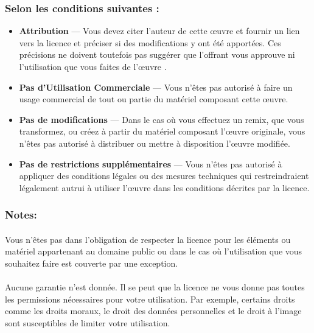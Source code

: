 \subsubsection{{\footnotesize Selon les conditions suivantes :}}
\begin{itemize}
\item  \textbf{Attribution} — Vous devez citer l'auteur de cette œuvre et fournir un lien vers la licence et préciser si des modifications y ont été apportées. Ces précisions ne doivent toutefois pas suggérer que l'offrant vous approuve ni l'utilisation que vous faites de l'œuvre .

\item  \textbf{Pas d’Utilisation Commerciale} — Vous n'êtes pas autorisé à faire un usage commercial de tout ou partie du matériel composant cette œuvre.

\item \textbf{Pas de modifications} — Dans le cas où vous effectuez un remix, que vous transformez, ou créez à partir du matériel composant l'œuvre originale, vous n'êtes pas autorisé à distribuer ou mettre à disposition l'œuvre modifiée.

\item \textbf{Pas de restrictions supplémentaires} — Vous n'êtes pas autorisé à appliquer des conditions légales ou des mesures techniques qui restreindraient légalement autrui à utiliser l'œuvre dans les conditions décrites par la licence.
\end{itemize}
  
\subsubsection{{\footnotesize  Notes:}}

\paragraph{}Vous n'êtes pas dans l'obligation de respecter la licence pour les éléments ou matériel appartenant au domaine public ou dans le cas où l'utilisation que vous souhaitez faire est couverte par une exception.
\paragraph{}Aucune garantie n'est donnée. Il se peut que la licence ne vous donne pas toutes les permissions nécessaires pour votre utilisation. Par exemple, certains droits comme les droits moraux, le droit des données personnelles et le droit à l'image sont susceptibles de limiter votre utilisation.


\clearpage
\normalsize